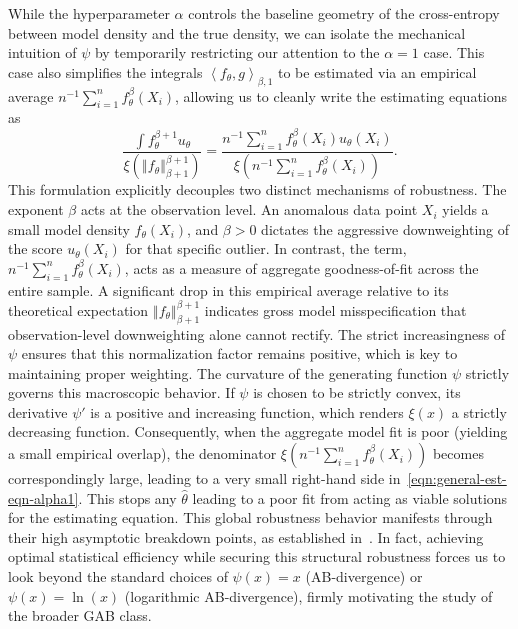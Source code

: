 \documentclass[11pt]{article}
\theoremstyle{plain}
\theoremstyle{remark}
\newcommand{\norm}[1]{\left\Vert #1 \right\Vert}
\newcommand{\inner}[1]{\left\langle #1\right\rangle}
\begin{document}
While the hyperparameter $\alpha$ controls the baseline geometry of the cross-entropy between model density and the true density, we can isolate the mechanical intuition of $\psi$ by temporarily restricting our attention to the $\alpha = 1$ case. This case also simplifies the integrals $\inner{f_\theta, g}_{\beta,1}$ to be estimated via an empirical average $n^{-1}\sum_{i=1}^n f_\theta^\beta(X_i)$, allowing us to cleanly write the estimating equations as
\begin{equation}
    \frac{\int f_\theta^{\beta+1} u_\theta}{ \xi(\norm{f_\theta}_{\beta+1}^{\beta+1})} = \frac{n^{-1}\sum_{i=1}^n f_\theta^\beta(X_i) u_\theta(X_i) }{\xi(n^{-1}\sum_{i=1}^n f_\theta^\beta(X_i))}.
    \label{eqn:general-est-eqn-alpha1}
\end{equation}
\noindent This formulation explicitly decouples two distinct mechanisms of robustness. The exponent $\beta$ acts at the observation level. An anomalous data point $X_i$ yields a small model density $f_\theta(X_i)$, and $\beta > 0$ dictates the aggressive downweighting of the score $u_\theta(X_i)$ for that specific outlier. In contrast, the term, $n^{-1}\sum_{i=1}^n f_\theta^\beta(X_i)$, acts as a measure of aggregate goodness-of-fit across the entire sample. A significant drop in this empirical average relative to its theoretical expectation $\norm{f_\theta}_{\beta+1}^{\beta+1}$ indicates gross model misspecification that observation-level downweighting alone cannot rectify. The strict increasingness of $\psi$ ensures that this normalization factor remains positive, which is key to maintaining proper weighting. The curvature of the generating function $\psi$ strictly governs this macroscopic behavior. If $\psi$ is chosen to be strictly convex, its derivative $\psi'$ is a positive and increasing function, which renders $\xi(x)$ a strictly decreasing function. Consequently, when the aggregate model fit is poor (yielding a small empirical overlap), the denominator $\xi(n^{-1}\sum_{i=1}^n f_\theta^\beta(X_i))$ becomes correspondingly large, leading to a very small right-hand side in~\eqref{eqn:general-est-eqn-alpha1}. This stops any $\hat{\theta}$ leading to a poor fit from acting as viable solutions for the estimating equation. This global robustness behavior manifests through their high asymptotic breakdown points, as established in~\cite{roy2026gaboptimal}. In fact, achieving optimal statistical efficiency while securing this structural robustness forces us to look beyond the standard choices of $\psi(x) = x$ (AB-divergence) or $\psi(x) = \ln(x)$ (logarithmic AB-divergence), firmly motivating the study of the broader GAB class.
\end{document}
